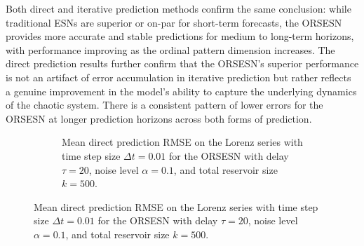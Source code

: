 Both direct and iterative prediction methods confirm the same conclusion: while traditional ESNs are superior or on-par for short-term forecasts, the ORSESN provides more accurate and stable predictions for medium to long-term horizons, with performance improving as the ordinal pattern dimension increases. The direct prediction results further confirm that the ORSESN's superior performance is not an artifact of error accumulation in iterative prediction but rather reflects a genuine improvement in the model's ability to capture the underlying dynamics of the chaotic system. There is a consistent pattern of lower errors for the ORSESN at longer prediction horizons across both forms of prediction.


\begin{figure}
    \centering

    \begin{subfigure}{\textwidth}
        \caption{Mean direct prediction RMSE on the Lorenz series with time step size $\Delta t=0.01$ for the ORSESN with delay $\tau=20$, noise level $\alpha=0.1$, and total reservoir size $k=500$.}
        \label{fig:ORSESN_direct_0_01}
        \centering
    \end{subfigure}

    \vspace{0.5em}


\end{figure}
